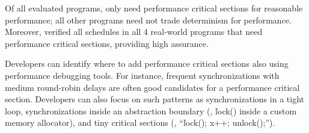 Of all \nprog evaluated programs, only \nprognondethints need performance critical
sections for reasonable performance; all other \nprognonondethints
programs need not trade determinism for performance.
Moreover, \ecosys verified all schedules in all 4 real-world programs that
need performance critical sections, providing high assurance.

Developers can identify where to add performance critical sections also
using performance debugging tools.  For instance, frequent
synchronizations with medium round-robin delays are often good candidates for
a performance critical section.  Developers can also focus on such
patterns as synchronizations in a tight loop,
synchronizations inside an abstraction boundary (\eg, \v{lock()}
inside a custom memory allocator), and tiny critical sections (\eg,
``\v{lock(); x++; unlock();}'').  









